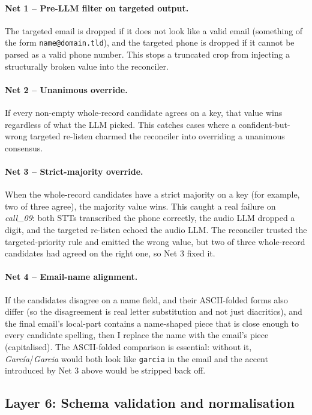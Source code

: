 \documentclass[11pt,a4paper]{article}
\begin{document}
\paragraph{Net 1 -- Pre-LLM filter on targeted output.} The targeted
email is dropped if it does not look like a valid email (something
of the form \verb|name@domain.tld|), and the targeted phone is
dropped if it cannot be parsed as a valid phone number. This stops a
truncated crop from injecting a structurally broken value into the
reconciler.

\paragraph{Net 2 -- Unanimous override.} If every non-empty
whole-record candidate agrees on a key, that value wins regardless
of what the LLM picked. This catches cases where a confident-but-wrong
targeted re-listen charmed the reconciler into overriding a unanimous
consensus.

\paragraph{Net 3 -- Strict-majority override.} When the whole-record
candidates have a strict majority on a key (for example, two of
three agree), the majority value wins. This caught a real failure on
\textit{call\_09}: both STTs transcribed the phone correctly, the
audio LLM dropped a digit, and the targeted re-listen echoed the
audio LLM. The reconciler trusted the targeted-priority rule and
emitted the wrong value, but two of three whole-record candidates had
agreed on the right one, so Net 3 fixed it.

\paragraph{Net 4 -- Email-name alignment.} If the candidates disagree
on a name field, and their ASCII-folded forms also differ (so the
disagreement is real letter substitution and not just diacritics),
and the final email's local-part contains a name-shaped piece that
is close enough to every candidate spelling, then I replace the
name with the email's piece (capitalised). The ASCII-folded
comparison is essential: without it,
\textit{Garc\'ia}/\textit{Garcia} would both look like \verb|garcia|
in the email and the accent introduced by Net 3 above would be
stripped back off.

\subsection{Layer 6: Schema validation and normalisation}
\end{document}
